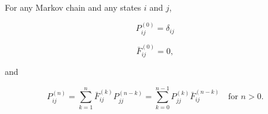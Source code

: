 For any Markov chain and any states $i$ and $j$,

$$P_{ij}^{(0)} = \delta_{ij}$$

$$\bar{F}_{ij}^{(0)} = 0,$$

and

$$P_{ij}^{(n)} = \sum_{k=1}^{n} \bar{F}_{ij}^{(k)} P_{jj}^{(n-k)} = \sum_{k=0}^{n-1} P_{jj}^{(k)} \bar{F}_{ij}^{(n-k)} \quad \text{for } n > 0.$$
